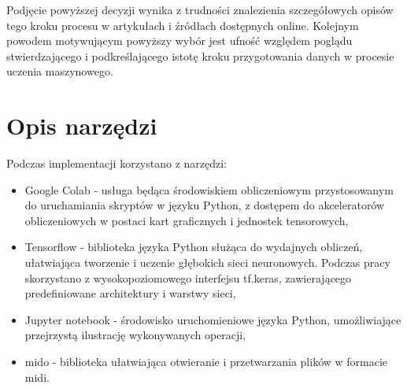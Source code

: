 {{    Podjęcie powyższej decyzji wynika z trudności znalezienia szczegółowych opisów tego kroku 
    procesu w artykułach i źródłach dostępnych online. 
    Kolejnym powodem motywującym powyższy wybór jest ufność względem poglądu stwierdzającego i 
    podkreślającego istotę kroku przygotowania danych w procesie uczenia maszynowego.

  }

  \section{Opis narzędzi}
  {
    Podczas implementacji korzystano z narzędzi:
    \begin{itemize}
      \setlength\itemsep{-0.5em}
      \item Google Colab - usługa będąca środowiskiem obliczeniowym przystosowanym 
      do uruchamiania skryptów w języku Python, z dostępem do akceleratorów obliczeniowych
      w postaci kart graficznych i jednostek tensorowych,
      \item Tensorflow - biblioteka języka Python służąca do wydajnych obliczeń, ułatwiająca 
      tworzenie i uczenie głębokich sieci neuronowych. Podczas pracy skorzystano z 
      wysokopoziomowego interfejsu tf.keras, zawierającego predefiniowane architektury i warstwy sieci,
      \item Jupyter notebook - środowisko uruchomieniowe języka Python, umożliwiające przejrzystą
      ilustrację wykonywanych operacji,
      \item mido - biblioteka ułatwiająca otwieranie i przetwarzania plików w formacie midi.
    \end{itemize}
  }
}